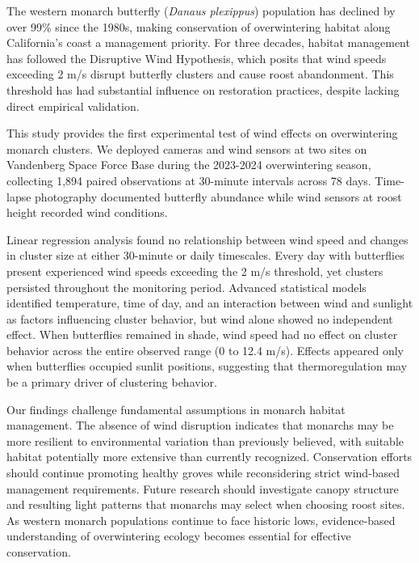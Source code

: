 The western monarch butterfly (\textit{Danaus plexippus}) population has declined by over 99\% since the 1980s, making conservation of overwintering habitat along California's coast a management priority. For three decades, habitat management has followed the Disruptive Wind Hypothesis, which posits that wind speeds exceeding 2 m/s disrupt butterfly clusters and cause roost abandonment. This threshold has had substantial influence on restoration practices, despite lacking direct empirical validation.

This study provides the first experimental test of wind effects on overwintering monarch clusters. We deployed cameras and wind sensors at two sites on Vandenberg Space Force Base during the 2023-2024 overwintering season, collecting 1,894 paired observations at 30-minute intervals across 78 days. Time-lapse photography documented butterfly abundance while wind sensors at roost height recorded wind conditions.

Linear regression analysis found no relationship between wind speed and changes in cluster size at either 30-minute or daily timescales. Every day with butterflies present experienced wind speeds exceeding the 2 m/s threshold, yet clusters persisted throughout the monitoring period. Advanced statistical models identified temperature, time of day, and an interaction between wind and sunlight as factors influencing cluster behavior, but wind alone showed no independent effect. When butterflies remained in shade, wind speed had no effect on cluster behavior across the entire observed range (0 to 12.4 m/s). Effects appeared only when butterflies occupied sunlit positions, suggesting that thermoregulation may be a primary driver of clustering behavior.

Our findings challenge fundamental assumptions in monarch habitat management. The absence of wind disruption indicates that monarchs may be more resilient to environmental variation than previously believed, with suitable habitat potentially more extensive than currently recognized. Conservation efforts should continue promoting healthy groves while reconsidering strict wind-based management requirements. Future research should investigate canopy structure and resulting light patterns that monarchs may select when choosing roost sites. As western monarch populations continue to face historic lows, evidence-based understanding of overwintering ecology becomes essential for effective conservation.